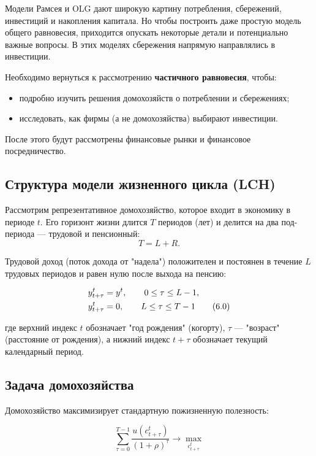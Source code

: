 \documentclass[10pt,a4paper]{article}
\begin{document}
Модели Рамсея и OLG дают широкую картину потребления, сбережений, инвестиций и накопления капитала. Но чтобы построить даже простую модель общего равновесия, приходится опускать некоторые детали и потенциально важные вопросы. В этих моделях сбережения напрямую направлялись в инвестиции.

Необходимо вернуться к рассмотрению \textbf{частичного равновесия}, чтобы:
\begin{itemize}[leftmargin=1.3em]
\item подробно изучить решения домохозяйств о потреблении и сбережениях;
\item исследовать, как фирмы (а не домохозяйства) выбирают инвестиции.
\end{itemize}
После этого будут рассмотрены финансовые рынки и финансовое посредничество.

\subsection{Структура модели жизненного цикла (LCH)}

Рассмотрим репрезентативное домохозяйство, которое входит в экономику в периоде $t$. Его горизонт жизни длится $T$ периодов (лет) и делится на два под-периода — трудовой и пенсионный:
$$T = L + R.$$

Трудовой доход (поток дохода от "надела") положителен и постоянен в течение $L$ трудовых периодов и равен нулю после выхода на пенсию:
\begin{formulabox}
\begin{align}
y_{t+\tau}^{t} &= y^{t}, \qquad 0 \le \tau \le L-1, \notag\\
y_{t+\tau}^{t} &= 0, \qquad L \le \tau \le T-1 \tag{6.$0$}
\end{align}
\end{formulabox}
где верхний индекс $t$ обозначает "год рождения" (когорту), $\tau$ — "возраст" (расстояние от рождения), а нижний индекс $t+\tau$ обозначает текущий календарный период.

\subsection{Задача домохозяйства}

Домохозяйство максимизирует стандартную пожизненную полезность:
\begin{formulabox}
\begin{equation}
\sum_{\tau=0}^{T-1} \frac{u(c_{t+\tau}^{t})}{(1+\rho)^\tau} \to \max_{c_{t+\tau}^{t}} \tag{6.1}
\end{equation}
\end{formulabox}
\end{document}
